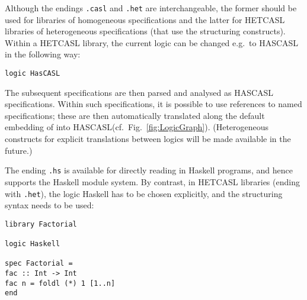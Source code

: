 \documentclass{article}
\newcommand{\eat}[1]{}
\newcommand{\normalTEXTSC}[2]{{#1\scriptsize#2}}
\newcommand     {\HasCASL}{\normalTEXTSC{H}{AS}\normalTEXTSC{C}{ASL}\xspace}
\newcommand{\CspCASL}{\normalTEXTSC{C}{SP}-\normalTEXTSC{C}{ASL}\xspace}
\newcommand{\Csp}{\normalTEXTSC{C}{SP}\xspace}
\newcommand{\HetCASL}{\normalTEXTSC{H}{ET}\normalTEXTSC{C}{ASL}\xspace}
\begin{document}
\medskip
Although the endings \texttt{.casl} and \texttt{.het} are
interchangeable, the former should be used for libraries of
homogeneous \CASL specifications and the latter for \HetCASL libraries
of heterogeneous specifications (that use the \CASL structuring
constructs). Within a \HetCASL library, the current logic can be changed e.g.\ 
to \HasCASL in the following way:

\begin{verbatim}
logic HasCASL
\end{verbatim}

The subsequent specifications are then parsed and analysed as
\HasCASL specifications. Within such specifications,
it is possible to use references to named \CASL specifications;
these are then automatically translated along the default
embedding of \CASL into \HasCASL (cf.\ Fig.~\ref{fig:LogicGraph}). 
(Heterogeneous constructs
for explicit translations between logics will be made available
in the future.)

\eat{
A \CspCASL specification consists of a \CASL specification
for the data part and a \Csp process built over this data part.
Therefore, \HetCASL provides a heterogeneous language construct
\texttt{data} as follows:

\begin{verbatim}
library Buffer

logic CASL

spec List =
  free type List[Elem] ::= nil | cons(Elem; List[Elem])
end

logic CspCASL

spec Buffer =
  data List
  channel read, write : Elem
  process read   
  let Buf(l:List[Elem]) =
              read?x -> Buf( cons(x,nil) )
              [] if l=nil then STOP else write!last(l) -> Buf( rest(l) )
              in Buf(nil)
end
\end{verbatim}

Here, the construct \texttt{data List} refers to the \CASL specification
\texttt{List}, which is implicitly embedded into \CspCASL.
}

The ending \texttt{.hs} is available for directly reading in
Haskell programs, and hence supports the Haskell module system.
By contrast, in \HetCASL libraries (ending with \texttt{.het}),
the logic Haskell has to be chosen explicitly, and the \CASL structuring
syntax needs to be used:

\begin{verbatim}
library Factorial

logic Haskell

spec Factorial =
fac :: Int -> Int
fac n = foldl (*) 1 [1..n]
end
\end{verbatim}
\end{document}
